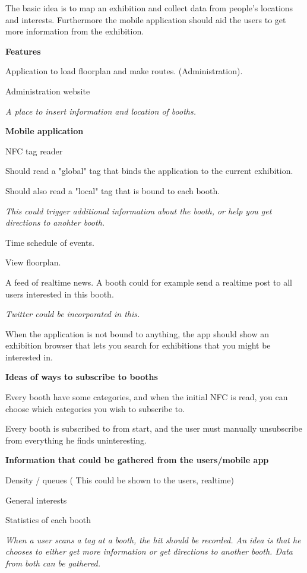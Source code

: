 The basic idea is to map an exhibition and collect data from people's locations and interests. Furthermore the mobile application should aid the users to get more information from the exhibition.


\textbf{Features}

Application to load floorplan and make routes. (Administration).

Administration website

\textit{A place to insert information and location of booths.}

\textbf{Mobile application}

NFC tag reader

Should read a "global" tag that binds the application to the current exhibition.

Should also read a "local" tag that is bound to each booth.

\textit{This could trigger additional information about the booth, or help you get directions to anohter booth.}

Time schedule of events.

View floorplan.

A feed of realtime news. A booth could for example send a realtime post to all users interested in this booth.

\textit{Twitter could be incorporated in this.}

When the application is not bound to anything, the app should show an exhibition browser that lets you search for exhibitions that you might be interested in.

\textbf{Ideas of ways to subscribe to booths}

Every booth have some categories, and when the initial NFC is read, you can choose which categories you wish to subscribe to.

Every booth is subscribed to from start, and the user must manually unsubscribe from everything he finds uninteresting.

\textbf{Information that could be gathered from the users/mobile app}

Density / queues ( This could be shown to the users, realtime)

General interests

Statistics of each booth

\textit{When a user scans a tag at a booth, the hit should be recorded. An idea is that he chooses to either get more information or get directions to another booth. Data from both can be gathered.}\citep{rtsbog}
